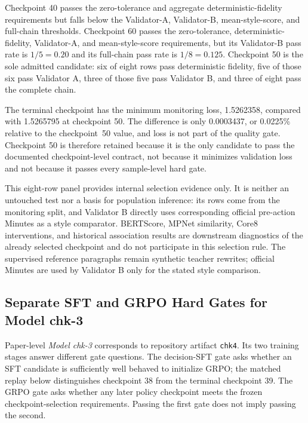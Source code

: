 Checkpoint 40 passes the zero-tolerance and aggregate deterministic-fidelity
requirements but falls below the Validator-A, Validator-B, mean-style-score,
and full-chain thresholds. Checkpoint 60 passes the zero-tolerance,
deterministic-fidelity, Validator-A, and mean-style-score requirements, but its
Validator-B pass rate is \(1/5=0.20\) and its full-chain pass rate is
\(1/8=0.125\). Checkpoint 50 is the sole admitted candidate: six of eight rows
pass deterministic fidelity, five of those six pass Validator A, three of
those five pass Validator B, and three of eight pass the complete chain.

The terminal checkpoint has the minimum monitoring loss, 1.5262358, compared
with 1.5265795 at checkpoint 50. The difference is only 0.0003437, or 0.0225\%
relative to the checkpoint~50 value, and loss is not part of the quality gate.
Checkpoint 50 is therefore retained because it is the only candidate to pass
the documented checkpoint-level contract, not because it minimizes validation
loss and not because it passes every sample-level hard gate.

This eight-row panel provides internal selection evidence only. It is neither
an untouched test nor a basis for population inference: its rows come from the
monitoring split, and Validator B directly uses corresponding official
pre-action Minutes as a style comparator. BERTScore, MPNet similarity, Core8
interventions, and historical association results are downstream diagnostics
of the already selected checkpoint and do not participate in this selection
rule. The supervised reference paragraphs remain synthetic teacher rewrites;
official Minutes are used by Validator B only for the stated style comparison.

\clearpage
\subsection*{Separate SFT and GRPO Hard Gates for Model chk-3}

Paper-level \textit{Model chk-3} corresponds to repository artifact
\texttt{chk4}. Its two training stages answer different gate questions. The
decision-SFT gate asks whether an SFT candidate is sufficiently well behaved to
initialize GRPO; the matched replay below distinguishes checkpoint 38 from the
terminal checkpoint 39. The GRPO gate asks whether any later policy checkpoint
meets the frozen checkpoint-selection requirements. Passing the first gate does
not imply passing the second.


